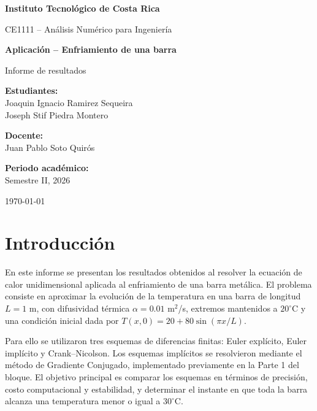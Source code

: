 \documentclass[12pt, letterpaper]{article}
\newcommand{\universidad}{Instituto Tecnológico de Costa Rica}
\newcommand{\curso}{CE1111 -- Análisis Numérico para Ingeniería}
\newcommand{\titulo}{Aplicación -- Enfriamiento de una barra}
\newcommand{\estudiantes}{%
    Joaquin Ignacio Ramirez Sequeira\\
    Joseph Stif Piedra Montero%
}
\newcommand{\profesor}{Juan Pablo Soto Quirós}
\newcommand{\semestre}{Semestre II, 2026}
\newcommand{\fecha}{\today}
\begin{document}
\begin{titlepage}
    \centering
    \vspace*{1cm}
    {\Large\textbf{\universidad}\par}
    \vspace{1.5cm}
    \vspace{1cm}
    {\large\curso\par}
    \vspace{2cm}
    {\LARGE\bfseries \titulo\par}
    \vspace{0.8cm}
    {\large Informe de resultados\par}
    \vspace{2cm}
    \begin{flushleft}
        \textbf{Estudiantes:}\\
        \estudiantes
        \vspace{0.6cm}

        \textbf{Docente:}\\
        \profesor
        \vspace{0.6cm}

        \textbf{Periodo académico:}\\
        \semestre
    \end{flushleft}
    \vfill
    {\large \fecha\par}
\end{titlepage}


\tableofcontents
\newpage

\section{Introducción}

En este informe se presentan los resultados obtenidos al resolver la ecuación de calor unidimensional aplicada al enfriamiento de una barra metálica. El problema consiste en aproximar la evolución de la temperatura en una barra de longitud \(L=1\) m, con difusividad térmica \(\alpha=0.01\) m\(^2\)/s, extremos mantenidos a \(20^\circ\)C y una condición inicial dada por \(T(x,0)=20+80\sin(\pi x/L)\).

Para ello se utilizaron tres esquemas de diferencias finitas: Euler explícito, Euler implícito y Crank--Nicolson. Los esquemas implícitos se resolvieron mediante el método de Gradiente Conjugado, implementado previamente en la Parte 1 del bloque. El objetivo principal es comparar los esquemas en términos de precisión, costo computacional y estabilidad, y determinar el instante en que toda la barra alcanza una temperatura menor o igual a \(30^\circ\)C.
\end{document}
